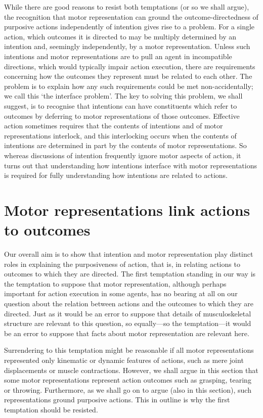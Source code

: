 \documentclass[12pt,\papersize]{extarticle}
\begin{document}
While there are good reasons to resist both temptations (or so we shall argue), the recognition that motor representation can ground the outcome-directedness of purposive actions independently of intention gives rise to a problem. For a single action, which outcomes it is directed to may be multiply determined by an intention and, seemingly independently, by a motor representation. Unless such intentions and motor representations are to pull an agent in incompatible directions, which would typically impair action execution, there are requirements concerning how the outcomes they represent must be related to each other. The problem is to explain how any such requirements could be met non-accidentally; we call this `the interface problem'. The key to solving this problem, we shall suggest, is to recognise that intentions can have constituents which refer to outcomes by deferring to motor representations of those outcomes. Effective action sometimes requires that the contents of intentions and of motor representations interlock, and this interlocking occurs when the contents of intentions are determined in part by the contents of motor representations.  So whereas discussions of intention frequently ignore motor aspects of action, it turns out that understanding how intentions interface with motor representations is required for fully understanding how intentions are related to actions.


\section{Motor representations link actions to outcomes}

Our overall aim is to show that intention and motor representation play distinct roles in explaining the purposiveness of action, that is, in relating actions to outcomes to which they are directed. The first temptation standing in our way is the temptation to suppose that motor representation, although perhaps important for action execution in some agents, has no bearing at all on our question about the relation between actions and the outcomes to which they are directed. Just as it would be an error to suppose that details of musculoskeletal structure are relevant to this question, so equally---so the temptation---it would be an error to suppose that facts about motor representation are relevant here. 

Surrendering to this temptation might be reasonable if all motor representations represented only kinematic or dynamic features of actions, such as mere joint displacements or muscle contractions. However, we shall argue in this section that some motor representations represent action outcomes such as grasping, tearing or throwing. Furthermore, as we shall go on to argue (also in this section), such representations ground purposive actions. This in outline is why the first temptation should be resisted.
\end{document}
